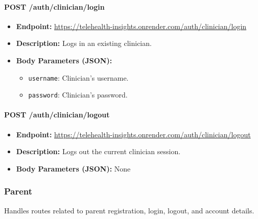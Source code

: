 \documentclass{article}
\begin{document}
\paragraph{POST /auth/clinician/login}
\begin{itemize}
    \item \textbf{Endpoint:} 
        \url{https://telehealth-insights.onrender.com/auth/clinician/login}
    \item \textbf{Description:} Logs in an existing clinician.
    \item \textbf{Body Parameters (JSON):}
    \begin{itemize}
        \item \texttt{username}: Clinician’s username.
        \item \texttt{password}: Clinician’s password.
    \end{itemize}
\end{itemize}

\paragraph{POST /auth/clinician/logout}
\begin{itemize}
    \item \textbf{Endpoint:} 
        \url{https://telehealth-insights.onrender.com/auth/clinician/logout}
    \item \textbf{Description:} Logs out the current clinician session.
    \item \textbf{Body Parameters (JSON):} None
\end{itemize}

\subsubsection{Parent}
Handles routes related to parent registration, login, logout, and account details.
\end{document}
